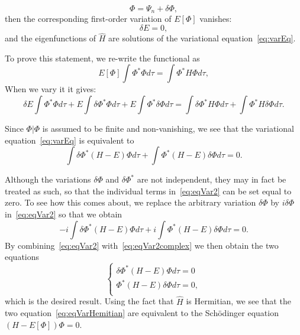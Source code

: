 \begin{equation*}
 \Phi = \Psi_n + \delta \Phi,
\end{equation*} 
then the corresponding first-order variation of $E[\Phi]$ vanishes:
\begin{equation}
\label{eq:varEq}
 \delta E=0,
\end{equation} 
and the eigenfunctions of $\hat{H}$ are solutions of the variational equation~\ref{eq:varEq}.

To prove this statement, we re-write the functional as
\begin{equation*}
 E[\Phi] \int  \Phi^*  \Phi d \tau = \int \Phi^* H  \Phi d \tau,
\end{equation*}
When we vary it it gives:
\begin{equation*}
 \delta E \int  \Phi^*  \Phi d \tau +  E \int  \delta \Phi^*  \Phi d \tau  + E \int  \Phi^* \delta \Phi d \tau = \int \delta \Phi^* H  \Phi d \tau + \int \Phi^* H  \delta \Phi d \tau.
\end{equation*}

Since $\Phi|  \Phi $ is assumed to be finite and non-vanishing, we see that the variational equation~\ref{eq:varEq} is equivalent to
\begin{equation}
\label{eq:eqVar2}
 \int  \delta \Phi^* (H-E) \Phi d \tau  + \int  \Phi^* (H-E) \delta \Phi d \tau = 0.
\end{equation}

Although the variations $\delta \Phi$ and $\delta \Phi^*$ are not independent, they may in fact be treated as such, so that the individual terms in~\ref{eq:eqVar2} can be set equal to zero. To see how this comes about, we replace the arbitrary variation $\delta \Phi$ by $i \delta \Phi$ in~\ref{eq:eqVar2} so that we obtain
\begin{equation}
\label{eq:eqVar2complex}
 -i \int  \delta \Phi^* (H-E) \Phi d \tau  + i \int  \Phi^* (H-E) \delta \Phi d \tau = 0.
\end{equation}
By combining~\ref{eq:eqVar2} with~\ref{eq:eqVar2complex} we then obtain the two equations
\begin{equation}
\label{eq:eqVarHemitian}
  \left\{
      \begin{aligned}
	\delta \Phi^* (H-E) \Phi d \tau = 0 \\
\Phi^* (H-E) \delta  \Phi d \tau = 0, \\
      \end{aligned}
    \right.
\end{equation}
which is the desired result. Using the fact that $\hat{H}$ is Hermitian, we see that the two equation~\ref{eq:eqVarHemitian} are equivalent to the Sch\"odinger equation $(H-E[\Phi]) \Phi = 0$.


